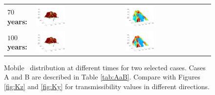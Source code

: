 \begin{figure}
\begin{tabular}{MMM}
\textbf{$70$ years:}&
\includegraphics[width=0.35\textwidth]{./figurer/C02222c70_pers}&
\includegraphics[width=0.35\textwidth]{./figurer/C03211c70_pers}\\
\textbf{$100$ years:}&
\includegraphics[width=0.35\textwidth]{./figurer/C02222c100_pers}&
\includegraphics[width=0.35\textwidth]{./figurer/C03211c100_pers}\\
\end{tabular}
\caption{Mobile \coo\ distribution at different times for two selected cases. Cases A and B are described in Table \ref{tab:AaB}. Compare with Figures \ref{fig:Kz} and \ref{fig:Ky} for transmissibility values in different directions.}
\label{fig:COplume}
\end{figure}

